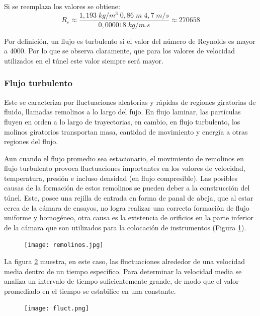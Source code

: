 Si se reemplaza los valores se obtiene:
\begin{equation} 
	R_e\approx \frac{1,193\;kg/m^{3}\;0,86\;m\;4,7\;m/s}{0,000018\;kg/m.s}\approx 270658
	\label{reyn2}
\end{equation}	

Por definición, un flujo es turbulento si el valor del número de Reynolds es mayor a 4000. Por lo que se observa claramente, que para los valores de velocidad utilizados en el túnel este valor siempre será mayor.

\subsubsection{Flujo turbulento} \label{sec:flujoT}
\begin{tcolorbox}[colback=blue!5!white,colframe=blue!75!black,title=Flujo turbulento]
	Este se caracteriza por fluctuaciones aleatorias y rápidas de regiones giratorias de fluido, llamadas remolinos a lo largo del fujo. En flujo laminar, las partículas fluyen en orden a lo largo de trayectorias, en cambio, en flujo turbulento, los molinos giratorios transportan masa, cantidad de movimiento y energía a otras regiones del flujo. \cite{yunus2006mecanica}
	
\end{tcolorbox}

Aun cuando el flujo promedio sea estacionario, el movimiento de remolinos en flujo turbulento provoca fluctuaciones importantes en los valores de velocidad, temperatura, presión e incluso densidad (en flujo compresible). Las posibles causas de la formación de estos remolinos se pueden deber a la construcción del túnel. Este, posee una rejilla de entrada en forma de panal de abeja, que al estar cerca de la cámara de ensayos, no logra realizar una correcta formación de flujo uniforme y homogéneo, otra causa es la existencia de orificios en la parte inferior de la cámara que son utilizados para la colocación de instrumentos (Figura \ref{fig:remolinos}).


\begin{figure}[h!]
	\centering
	\texttt{[image: remolinos.jpg]}
	\label{fig:remolinos}
\end{figure}


La figura \ref{fig:fluct} muestra, en este caso, las fluctuaciones alrededor de una velocidad media dentro de un tiempo específico. 
Para determinar la velocidad media se analiza un intervalo de tiempo suficientemente grande, de modo que el valor promediado en el tiempo se estabilice en una constante.
\begin{figure}[h!]
	\centering
	\texttt{[image: fluct.png]}
	\label{fig:fluct}
\end{figure}


